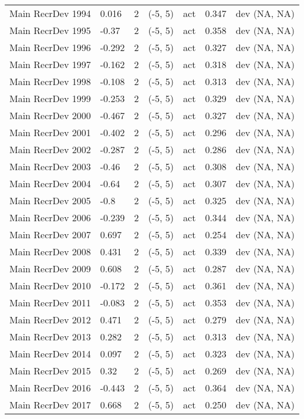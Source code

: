 \documentclass[11pt,
  english,
  letterpaper,
]{article}
\begin{document}
\begin{landscape}
\begin{longtable}[t]{>{\raggedright\arraybackslash}p{7.5cm}lllll>{\raggedright\arraybackslash}p{3.5cm}}
Main RecrDev 1994 & 0.016 & 2 & (-5, 5) & act & 0.347 & dev (NA, NA)\\
Main RecrDev 1995 & -0.37 & 2 & (-5, 5) & act & 0.358 & dev (NA, NA)\\
Main RecrDev 1996 & -0.292 & 2 & (-5, 5) & act & 0.327 & dev (NA, NA)\\
Main RecrDev 1997 & -0.162 & 2 & (-5, 5) & act & 0.318 & dev (NA, NA)\\
Main RecrDev 1998 & -0.108 & 2 & (-5, 5) & act & 0.313 & dev (NA, NA)\\
Main RecrDev 1999 & -0.253 & 2 & (-5, 5) & act & 0.329 & dev (NA, NA)\\
Main RecrDev 2000 & -0.467 & 2 & (-5, 5) & act & 0.327 & dev (NA, NA)\\
Main RecrDev 2001 & -0.402 & 2 & (-5, 5) & act & 0.296 & dev (NA, NA)\\
Main RecrDev 2002 & -0.287 & 2 & (-5, 5) & act & 0.286 & dev (NA, NA)\\
Main RecrDev 2003 & -0.46 & 2 & (-5, 5) & act & 0.308 & dev (NA, NA)\\
Main RecrDev 2004 & -0.64 & 2 & (-5, 5) & act & 0.307 & dev (NA, NA)\\
Main RecrDev 2005 & -0.8 & 2 & (-5, 5) & act & 0.325 & dev (NA, NA)\\
Main RecrDev 2006 & -0.239 & 2 & (-5, 5) & act & 0.344 & dev (NA, NA)\\
Main RecrDev 2007 & 0.697 & 2 & (-5, 5) & act & 0.254 & dev (NA, NA)\\
Main RecrDev 2008 & 0.431 & 2 & (-5, 5) & act & 0.339 & dev (NA, NA)\\
Main RecrDev 2009 & 0.608 & 2 & (-5, 5) & act & 0.287 & dev (NA, NA)\\
Main RecrDev 2010 & -0.172 & 2 & (-5, 5) & act & 0.361 & dev (NA, NA)\\
Main RecrDev 2011 & -0.083 & 2 & (-5, 5) & act & 0.353 & dev (NA, NA)\\
Main RecrDev 2012 & 0.471 & 2 & (-5, 5) & act & 0.279 & dev (NA, NA)\\
Main RecrDev 2013 & 0.282 & 2 & (-5, 5) & act & 0.313 & dev (NA, NA)\\
Main RecrDev 2014 & 0.097 & 2 & (-5, 5) & act & 0.323 & dev (NA, NA)\\
Main RecrDev 2015 & 0.32 & 2 & (-5, 5) & act & 0.269 & dev (NA, NA)\\
Main RecrDev 2016 & -0.443 & 2 & (-5, 5) & act & 0.364 & dev (NA, NA)\\
Main RecrDev 2017 & 0.668 & 2 & (-5, 5) & act & 0.250 & dev (NA, NA)\\

\end{longtable}
\end{landscape}
\end{document}
